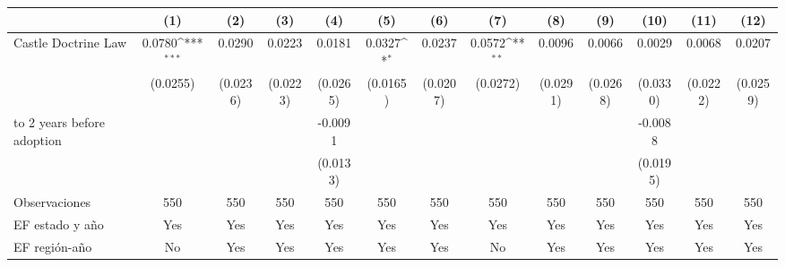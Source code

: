 {
\def\sym#1{\ifmmode^{#1}\else\(^{#1}\)\fi}
\begin{tabular}{l*{12}{c}}
\toprule
                    &\multicolumn{1}{c}{(1)}         &\multicolumn{1}{c}{(2)}         &\multicolumn{1}{c}{(3)}         &\multicolumn{1}{c}{(4)}         &\multicolumn{1}{c}{(5)}         &\multicolumn{1}{c}{(6)}         &\multicolumn{1}{c}{(7)}         &\multicolumn{1}{c}{(8)}         &\multicolumn{1}{c}{(9)}         &\multicolumn{1}{c}{(10)}         &\multicolumn{1}{c}{(11)}         &\multicolumn{1}{c}{(12)}         \\
\midrule
Castle Doctrine Law &      0.0780\sym{***}&      0.0290         &      0.0223         &      0.0181         &      0.0327\sym{*}  &      0.0237         &      0.0572\sym{**} &      0.0096         &      0.0066         &      0.0029         &      0.0068         &      0.0207         \\
                    &    (0.0255)         &    (0.0236)         &    (0.0223)         &    (0.0265)         &    (0.0165)         &    (0.0207)         &    (0.0272)         &    (0.0291)         &    (0.0268)         &    (0.0330)         &    (0.0222)         &    (0.0259)         \\
\addlinespace
0 to 2 years before adoption&                     &                     &                     &     -0.0091         &                     &                     &                     &                     &                     &     -0.0088         &                     &                     \\
                    &                     &                     &                     &    (0.0133)         &                     &                     &                     &                     &                     &    (0.0195)         &                     &                     \\
\midrule
Observaciones       &         550         &         550         &         550         &         550         &         550         &         550         &         550         &         550         &         550         &         550         &         550         &         550         \\
EF estado y año     &         Yes         &         Yes         &         Yes         &         Yes         &         Yes         &         Yes         &         Yes         &         Yes         &         Yes         &         Yes         &         Yes         &         Yes         \\
EF región-año       &          No         &         Yes         &         Yes         &         Yes         &         Yes         &         Yes         &          No         &         Yes         &         Yes         &         Yes         &         Yes         &         Yes         \\

\end{tabular}}
